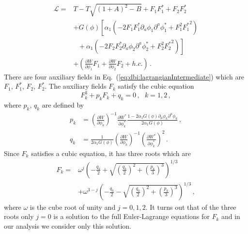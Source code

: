 \documentclass[12pt]{article}
\begin{document}
\begin{equation} \label{eq:dbi:lagrangianIntermediate}
  \begin{aligned}
    \mathcal{L} =
      & T - T \sqrt{\left(1 + A\right)^2 - B} + F_1 F^*_1 + F_2 F^*_2\\
      &+ G\left(\phi\right) \left[
        \alpha_1 \left(
          - 2 F_1 F^*_1 \partial_a \phi_1 \partial^a \phi^*_1
          + F_1^2 {F^*_1}^2
        \right)\right.\\
        &~~~ \left.{} + \alpha_1 \left(
          - 2 F_2 F^*_2 \partial_a \phi_2 \partial^a \phi^*_2
          + F_2^2 {F^*_2}^2
        \right)\right]\\
      &+ \left(
          \frac{\partial W}{\partial \phi_1} F_1
        + \frac{\partial W}{\partial \phi_2} F_2
        + h.c.
      \right)\,.
  \end{aligned}
\end{equation}
There are four auxiliary fields in Eq.~(\ref{eq:dbi:lagrangianIntermediate}) which are $F_1$, $F^*_1$, $F_2$, $F^*_2$.
The auxiliary fields $F_k$ satisfy the cubic equation
\begin{equation}
  F_k^3 + p_k F_k + q_k = 0\,,
  ~~~ k = 1, 2\,,
\end{equation}
where $p_k$, $q_k$ are defined by
\begin{equation} \label{eq:DBI:pq}
  \begin{aligned}
    p_k &=
      \left(\frac{\partial W}{\partial \phi_k}\right)^{-1}
      \frac{\partial W^*}{\partial \phi^*_k}
      \frac
        {1 - 2 \alpha_1 G\left(\phi\right) \partial_\mu \phi_k \partial^\mu \phi_k}
        {2 \alpha_1 G\left(\phi\right)}\,,\\
    q_k &=
      \frac{1}{2 \alpha_1 G\left(\phi\right)}
      \left(\frac{\partial W}{\partial \phi_k}\right)^{-1}
      \left(\frac{\partial W^*}{\partial \phi^*_k}\right)^2\,.
  \end{aligned}
\end{equation}
Since $F_k$ satisfies a cubic equation, it has three roots which are
\begin{equation} \label{eq:DBI:F}
  \begin{aligned}
    F_k = &\omega^j \left(
      - \frac{q_k}{2}
      + \sqrt{\left(\frac{q_k}{2}\right)^2 + \left(\frac{p_k}{3}\right)^3}\right)^{1 / 3}\\
    & + \omega^{3 - j} \left(
      - \frac{q_k}{2}
      - \sqrt{\left(\frac{q_k}{2}\right)^2 + \left(\frac{p_k}{3}\right)^3}\right)^{1 / 3}\,,
  \end{aligned}
\end{equation}
where $\omega$ is the cube root of unity and $j = 0, 1, 2$.
It turns out that of the three roots only $j = 0$ is a solution to the full Euler-Lagrange equations for $F_k$ and in our analysis we consider only this solution.
\end{document}
